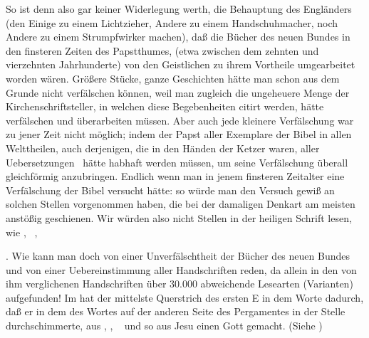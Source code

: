 \begin{aufza}[1)]
\begin{RWanm}So ist denn also gar keiner Widerlegung werth, die Behauptung des Engländers  (den Einige zu einem Lichtzieher, Andere zu einem Handschuhmacher, noch Andere zu einem Strumpfwirker machen), daß die Bücher des neuen Bundes in den finsteren Zeiten des Papstthumes, (etwa zwischen dem zehnten und vierzehnten Jahrhunderte) von den Geistlichen zu ihrem Vortheile umgearbeitet worden wären. Größere Stücke, ganze Geschichten hätte man schon aus dem Grunde nicht verfälschen können, weil man zugleich die ungeheuere Menge der Kirchenschriftsteller, in welchen diese Begebenheiten citirt werden, hätte verfälschen und überarbeiten müssen. Aber auch jede kleinere Verfälschung war zu jener Zeit nicht möglich; indem der Papst aller Exemplare der Bibel in allen Welttheilen, auch derjenigen, die in den Händen der Ketzer waren, aller Uebersetzungen \usw\ hätte habhaft werden müssen, um seine Verfälschung überall gleichförmig anzubringen. Endlich wenn man in jenem finsteren Zeitalter eine Verfälschung der Bibel versucht hätte: so würde man den Versuch gewiß an solchen Stellen vorgenommen haben, die bei der damaligen Denkart am meisten anstößig geschienen. Wir würden also nicht Stellen in der heiligen Schrift lesen, wie , \ , \umA~
\end{RWanm}
\end{aufza}\par
{}. Wie kann man doch von einer Unverfälschtheit der Bücher des neuen Bundes und von einer Uebereinstimmung aller Handschriften reden, da  allein in den von ihm verglichenen Handschriften über 30.000 abweichende Lesearten (Varianten) aufgefunden! Im  hat der mittelste Querstrich des ersten E in dem Worte  dadurch, daß er in dem  des Wortes  auf der anderen Seite des Pergamentes in der Stelle  durchschimmerte, aus , , \di\  und so aus Jesu einen Gott gemacht. (Siehe  )\par
